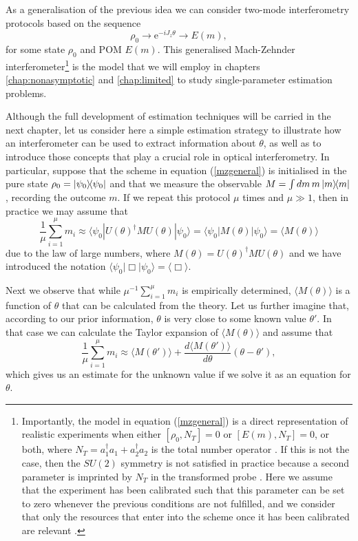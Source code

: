 As a generalisation of the previous idea we can consider two-mode interferometry protocols based on the sequence
\begin{equation}
\rho_0 \rightarrow \mathrm{e}^{-iJ_z\theta} \rightarrow E(m),
\label{mzgeneral}
\end{equation}
for some state $\rho_0$ and POM $E(m)$. This generalised Mach-Zehnder interferometer\footnote{Importantly, the model in equation (\ref{mzgeneral}) is a direct representation of realistic experiments when either $[\rho_0, N_T] = 0$ or $[E(m), N_T] = 0$, or both, where $N_T = a_1^\dagger a_1 + a_2^\dagger a_2$ is the total number operator \cite{yurke1986, pezze2015}. If this is not the case, then the $SU(2)$ symmetry is not satisfied in practice because a second parameter is imprinted by $N_T$ in the transformed probe \cite{pezze2015}. Here we assume that the experiment has been calibrated such that this parameter can be set to zero whenever the previous conditions are not fulfilled, and we consider that only the resources that enter into the scheme once it has been calibrated are relevant \cite{proctor2017networked}.} is the model that we will employ in chapters \ref{chap:nonasymptotic} and \ref{chap:limited} to study single-parameter estimation problems. 

Although the full development of estimation techniques will be carried in the next chapter, let us consider here a simple estimation strategy to illustrate how an interferometer can be used to extract information about $\theta$, as well as to introduce those concepts that play a crucial role in optical interferometry. In particular, suppose that the scheme in equation (\ref{mzgeneral}) is initialised in the pure state $ \rho_0 = \ketbra{\psi_0}$ and that we measure the observable $M = \int dm\,m \ketbra{m}$, recording the outcome $m$. If we repeat this protocol $\mu$ times and $\mu \gg 1$, then in practice we may assume that 
\begin{equation}
\frac{1}{\mu}\sum_{i=1}^\mu m_i \approx \langle \psi_0 | U(\theta)^\dagger M U(\theta) |\psi_0 \rangle = \langle \psi_0 | M(\theta) |\psi_0 \rangle = \langle  M(\theta) \rangle
\end{equation}
due to the law of large numbers, where $M(\theta) = U(\theta)^\dagger M U(\theta)$ and we have introduced the notation $\langle \psi_0 |\Box | \psi_0 \rangle = \langle \Box \rangle$.

Next we observe that while $\mu^{-1}\sum_{i=1}^\mu m_i$ is empirically determined, $\langle M(\theta)\rangle$ is a function of $\theta$ that can be calculated from the theory. Let us further imagine that, according to our prior information, $\theta$ is very close to some known value $\theta'$. In that case we can calculate the Taylor expansion of $\langle M(\theta) \rangle$ and assume that
\begin{equation}
\frac{1}{\mu}\sum_{i=1}^\mu m_i \approx \langle M(\theta') \rangle + \frac{d \langle M(\theta') \rangle}{d\theta}(\theta - \theta'),
\end{equation}
which gives us an estimate for the unknown value if we solve it as an equation for $\theta$.

